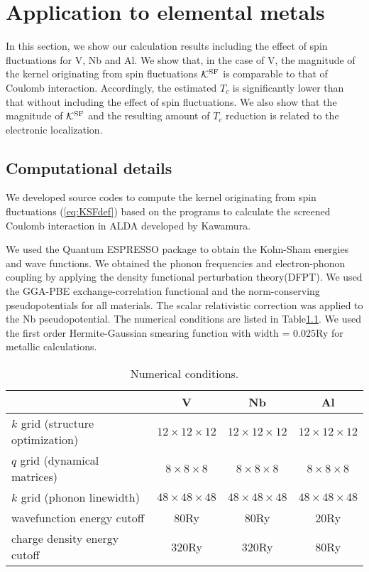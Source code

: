 

%
%
\chapter{Application to elemental metals}
\label{application}
In this section, we show our calculation results including the effect of spin fluctuations 
for V, Nb and Al. We show that, in the case of V, the magnitude of the kernel originating 
from spin fluctuations $\mathcal K^{\rm SF}$ is comparable to that of Coulomb interaction.
Accordingly, the estimated $T_{c}$ is significantly lower than that without including the
effect of spin fluctuations. We also show that the magnitude of $\mathcal K^{\rm SF}$ and the 
resulting amount of $T_{c}$ reduction is related to the electronic localization.

\section{Computational details}
We developed source codes to compute the kernel originating from spin fluctuations (\ref{eq:KSFdef}) 
based on the programs to calculate the screened Coulomb interaction in ALDA
developed by Kawamura\cite{KMurl,Kawamura2016}.

We used the Quantum ESPRESSO package\cite{QE} to obtain the Kohn-Sham energies and wave functions.
We obtained the phonon frequencies and electron-phonon coupling by applying the density functional
perturbation theory(DFPT)\cite{DFPT}.
We used the GGA-PBE exchange-correlation functional\cite{GGAPBE} and the norm-conserving 
pseudopotentials\cite{normcons} for all materials. 
The scalar relativistic correction was applied to the Nb pseudopotential.
The numerical conditions are listed in Table\ref{tab:numcond}.
We used the first order Hermite-Gaussian smearing function\cite{Paxton1989} 
with width = $0.025$Ry for metallic calculations.

\begin{table}[hbtp]
	\centering
	\caption{Numerical conditions.}
	\begin{tabular}{lccc}
		\hline \hline
		& V & Nb & Al \\
		\hline
	$k$ grid (structure optimization) & $12\times12\times12$ & $12\times12\times12$ & $12\times12\times12$ \\
	$q$ grid (dynamical matrices) & $ 8\times8\times8$ & $8\times8\times8$ & $8\times8\times8$ \\
	$k$ grid (phonon linewidth) & $48\times48\times48$ & $48\times48\times48$ & $48\times48\times48$ \\
	wavefunction energy cutoff & 80Ry & 80Ry & 20Ry \\
	charge density energy cutoff & 320Ry & 320Ry & 80Ry \\
	\hline \hline
	\end{tabular}
	\label{tab:numcond}
\end{table}

